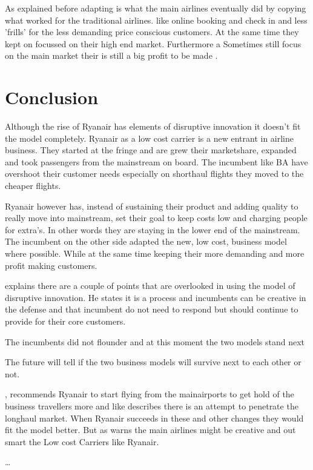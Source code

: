\documentclass[a4paper, 11pt]{article}
\begin{document}
As explained before adapting is what the main airlines eventually did by copying what worked for the traditional airlines. like online booking and check in and less 'frills' for the less demanding price conscious customers. At the same time they kept on focussed on their high end market. Furthermore a  Sometimes still focus on the main market their is still a big profit to be made \cite{Christensen2015}.


\section{Conclusion}

Although the rise of Ryanair has elements of disruptive innovation it doesn't fit the model completely. Ryanair as a low cost carrier is a new entrant in airline business. They started at the fringe and are grew their marketshare, expanded and took passengers from the mainstream on board. The incumbent like BA have overshoot their customer needs especially on shorthaul flights they moved to the cheaper flights.

Ryanair however has, instead of sustaining their product and adding quality to really move into mainstream, set their goal to keep costs low and charging people for extra's. In other words they are staying in the lower end of the mainstream. The incumbent on the other side adapted the new, low cost, business model where possible. While at the same time keeping their more demanding and more profit making customers.

\cite{Christensen2015} explains there are a couple of points that are overlooked in using the model of disruptive innovation. He states it is a process and incumbents can be creative in the defense and that incumbent do not need to respond but should continue to provide for their core customers.

The incumbents did not flounder and at this moment the two models stand next

The future will tell if the two business models will survive next to each other or not.

\cite{Diaconu}, recommends Ryanair to start flying from the mainairports to get hold of the business travellers more and like \cite{Eurocontrol2018} describes there is an attempt to penetrate the longhaul market. When Ryanair succeeds in these and other changes they would fit the model better. But as \cite{Christensen2015} warns the main airlines might be creative and out smart the Low cost Carriers like Ryanair.

\ldots




\renewcommand{\textbf}{}
\renewcommand{\bf}{}
{}
\end{document}
